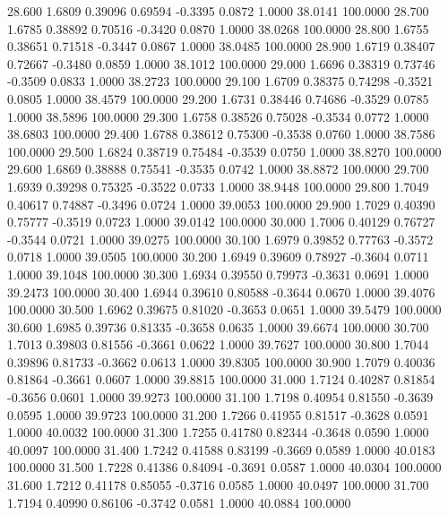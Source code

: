   28.600   1.6809   0.39096   0.69594  -0.3395   0.0872   1.0000  38.0141 100.0000
  28.700   1.6785   0.38892   0.70516  -0.3420   0.0870   1.0000  38.0268 100.0000
  28.800   1.6755   0.38651   0.71518  -0.3447   0.0867   1.0000  38.0485 100.0000
  28.900   1.6719   0.38407   0.72667  -0.3480   0.0859   1.0000  38.1012 100.0000
  29.000   1.6696   0.38319   0.73746  -0.3509   0.0833   1.0000  38.2723 100.0000
  29.100   1.6709   0.38375   0.74298  -0.3521   0.0805   1.0000  38.4579 100.0000
  29.200   1.6731   0.38446   0.74686  -0.3529   0.0785   1.0000  38.5896 100.0000
  29.300   1.6758   0.38526   0.75028  -0.3534   0.0772   1.0000  38.6803 100.0000
  29.400   1.6788   0.38612   0.75300  -0.3538   0.0760   1.0000  38.7586 100.0000
  29.500   1.6824   0.38719   0.75484  -0.3539   0.0750   1.0000  38.8270 100.0000
  29.600   1.6869   0.38888   0.75541  -0.3535   0.0742   1.0000  38.8872 100.0000
  29.700   1.6939   0.39298   0.75325  -0.3522   0.0733   1.0000  38.9448 100.0000
  29.800   1.7049   0.40617   0.74887  -0.3496   0.0724   1.0000  39.0053 100.0000
  29.900   1.7029   0.40390   0.75777  -0.3519   0.0723   1.0000  39.0142 100.0000
  30.000   1.7006   0.40129   0.76727  -0.3544   0.0721   1.0000  39.0275 100.0000
  30.100   1.6979   0.39852   0.77763  -0.3572   0.0718   1.0000  39.0505 100.0000
  30.200   1.6949   0.39609   0.78927  -0.3604   0.0711   1.0000  39.1048 100.0000
  30.300   1.6934   0.39550   0.79973  -0.3631   0.0691   1.0000  39.2473 100.0000
  30.400   1.6944   0.39610   0.80588  -0.3644   0.0670   1.0000  39.4076 100.0000
  30.500   1.6962   0.39675   0.81020  -0.3653   0.0651   1.0000  39.5479 100.0000
  30.600   1.6985   0.39736   0.81335  -0.3658   0.0635   1.0000  39.6674 100.0000
  30.700   1.7013   0.39803   0.81556  -0.3661   0.0622   1.0000  39.7627 100.0000
  30.800   1.7044   0.39896   0.81733  -0.3662   0.0613   1.0000  39.8305 100.0000
  30.900   1.7079   0.40036   0.81864  -0.3661   0.0607   1.0000  39.8815 100.0000
  31.000   1.7124   0.40287   0.81854  -0.3656   0.0601   1.0000  39.9273 100.0000
  31.100   1.7198   0.40954   0.81550  -0.3639   0.0595   1.0000  39.9723 100.0000
  31.200   1.7266   0.41955   0.81517  -0.3628   0.0591   1.0000  40.0032 100.0000
  31.300   1.7255   0.41780   0.82344  -0.3648   0.0590   1.0000  40.0097 100.0000
  31.400   1.7242   0.41588   0.83199  -0.3669   0.0589   1.0000  40.0183 100.0000
  31.500   1.7228   0.41386   0.84094  -0.3691   0.0587   1.0000  40.0304 100.0000
  31.600   1.7212   0.41178   0.85055  -0.3716   0.0585   1.0000  40.0497 100.0000
  31.700   1.7194   0.40990   0.86106  -0.3742   0.0581   1.0000  40.0884 100.0000
